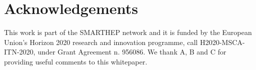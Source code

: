 \documentclass{smarthepnote}
\begin{document}
\begin{abstract}

\end{abstract}

\vfill
\makereviewtable
\clearpage

\begingroup
\color{black}
\endgroup
\pagebreak












\clearpage
\section*{Acknowledgements}
This work is part of the SMARTHEP network and it is funded by the European Union’s Horizon 2020 research and innovation programme, call H2020-MSCA-ITN-2020, under Grant Agreement n. 956086. 
We thank A, B and C for providing useful comments to this whitepaper. 




%
\end{document}
